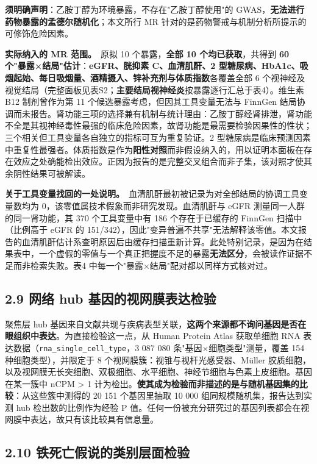 \documentclass[UTF8,fontset=windows,11pt]{ctexart}
\begin{document}
\textbf{须明确声明}：乙胺丁醇为环境暴露，不存在"乙胺丁醇使用"的 GWAS，\textbf{无法进行药物暴露的孟德尔随机化}；本文所行 MR 针对的是药物警戒与机制分析所提示的可修饰危险因素。

\textbf{实际纳入的 MR 范围。}\ 原拟 10 个暴露，\textbf{全部 10 个均已获取}，共得到 \textbf{60 个"暴露×结局"估计}：\textbf{eGFR、胱抑素 C、血清肌酐、2 型糖尿病、HbA1c、吸烟起始、每日吸烟量、酒精摄入、锌补充剂与体质指数}各覆盖全部 6 个视神经及视觉结局（完整面板见表S2；\textbf{主要结局视神经炎}按暴露逐行汇总于表4）。维生素 B12 制剂曾作为第 11 个候选暴露考虑，但因其工具变量无法与 FinnGen 结局协调而未报告。肾功能三项的选择兼有机制与统计理由：乙胺丁醇经肾排泄，肾功能不全是其视神经毒性最强的临床危险因素，故肾功能是最需要检验因果性的性状；三个相关但工具变量各自独立的指标可互为重复验证。2 型糖尿病是临床预测因素中重复性最强者。体质指数是作为\textbf{阳性对照}而非假设纳入的，用以证明本面板在存在效应之处确能检出效应。正因为报告的是完整交叉组合而非子集，该对照才使其余阴性结果可被解读。

\textbf{关于工具变量找回的一处说明。}\ 血清肌酐最初被记录为对全部结局的协调工具变量数均为 0，该零值属技术假象而非研究发现。血清肌酐与 eGFR 测量同一人群的同一肾功能，其 370 个工具变量中有 186 个存在于已缓存的 FinnGen 扫描中（比例高于 eGFR 的 151/342），因此"变异普遍不共享"无法解释该零值。本文报告的血清肌酐估计系查明原因后由缓存扫描重新计算。此处特别记录，是因为在结果表中，一个虚假的零值与一个真正把握度不足的暴露\textbf{无法区分}，会被读作证据不足而非检索失败。表4 中每一个"暴露×结局"配对都以同样方式核对过。

\subsection{2.9 网络 hub 基因的视网膜表达检验}

聚焦层 hub 基因来自文献共现与疾病表型关联，\textbf{这两个来源都不询问基因是否在眼组织中表达}。为直接检验这一点，从 Human Protein Atlas 获取单细胞 RNA 表达数据（\texttt{rna\_single\_cell\_type}，3 087 080 条"基因×细胞类型"测量，覆盖 154 种细胞类型），并限定于 8 个视网膜簇：视锥与视杆光感受器、Müller 胶质细胞，以及视网膜无长突细胞、双极细胞、水平细胞、神经节细胞与色素上皮细胞。基因在某一簇中 nCPM > 1 计为检出。\textbf{使其成为检验而非描述的是与随机基因集的比较}：从这些簇中测得的 20 151 个基因里抽取 10 000 组同规模随机集，报告达到实测 hub 检出数的比例作为经验 P 值。任何一份被充分研究过的基因列表都会在视网膜中表达，故只有该比较具有信息量。

\subsection{2.10 铁死亡假说的类别层面检验}
\end{document}
